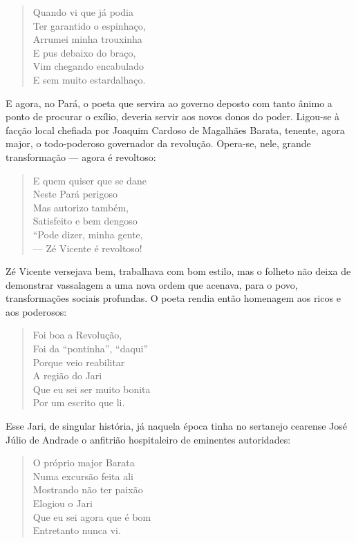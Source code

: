 \begin{verse}
Quando vi que já podia\\
Ter garantido o espinhaço, \\
Arrumei minha trouxinha\\
E pus debaixo do braço,\\
Vim chegando encabulado\\
E sem muito estardalhaço.
\end{verse}

E agora, no Pará, o poeta que servira ao governo deposto com tanto
ânimo a ponto de procurar o exílio, deveria servir aos novos donos do
poder. Ligou-se à facção local chefiada por Joaquim Cardoso de
Magalhães Barata, tenente, agora major, o todo-poderoso governador da
revolução. Opera-se, nele, grande transformação — agora é revoltoso: 

\begin{verse}
E quem quiser que se dane\\
Neste Pará perigoso\\
Mas autorizo também,\\
Satisfeito e bem dengoso\\
“Pode dizer, minha gente,\\
— Zé Vicente é revoltoso!
\end{verse}

Zé Vicente versejava bem, trabalhava com bom estilo, mas o folheto não
deixa de demonstrar vassalagem a uma nova ordem que acenava, para o
povo, transformações sociais profundas. O poeta rendia então
homenagem aos ricos e aos poderosos: 

\begin{verse}
Foi boa a Revolução,\\
Foi da “pontinha”, “daqui”\\
Porque veio reabilitar\\
A região do Jari\\
Que eu sei ser muito bonita\\
Por um escrito que li.
\end{verse}

Esse Jari, de singular história, já naquela época tinha no sertanejo
cearense José Júlio de Andrade o anfitrião hospitaleiro de eminentes
autoridades:

\begin{verse}
O próprio major Barata\\
Numa excursão feita ali\\
Mostrando não ter paixão\\
Elogiou o Jari\\
Que eu sei agora que é bom\\
Entretanto nunca vi.
\end{verse}

